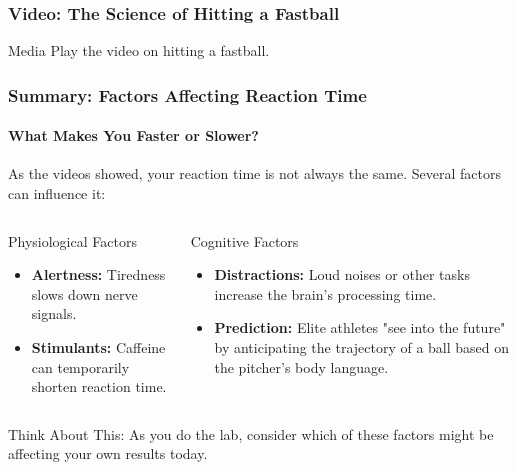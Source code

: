\documentclass{beamer}
\begin{document}
\begin{frame}
\frametitle{Video: The Science of Hitting a Fastball}
    \vfill
    \begin{alertblock}{Media}
        Play the video on hitting a fastball.
    \end{alertblock}
    \vfill
\end{frame}

\begin{frame}
\frametitle{Summary: Factors Affecting Reaction Time}
\framesubtitle{What Makes You Faster or Slower?}
    As the videos showed, your reaction time is not always the same. Several factors can influence it:
    \begin{columns}[T]
            \begin{block}{Physiological Factors}
                \begin{itemize}
                    \item \textbf{Alertness:} Tiredness slows down nerve signals.
                    \item \textbf{Stimulants:} Caffeine can temporarily shorten reaction time.
                \end{itemize}
            \end{block}
        
            \begin{block}{Cognitive Factors}
                \begin{itemize}
                    \item \textbf{Distractions:} Loud noises or other tasks increase the brain's processing time.
                    \item \textbf{Prediction:} Elite athletes "see into the future" by anticipating the trajectory of a ball based on the pitcher's body language.
                \end{itemize}
            \end{block}
    \end{columns}
    \vfill
    \begin{alertblock}{Think About This:}
    As you do the lab, consider which of these factors might be affecting your own results today.
    \end{alertblock}
\end{frame}
\end{document}
